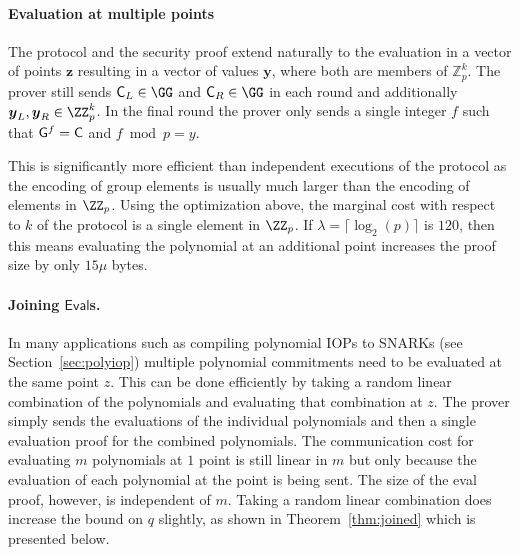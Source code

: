 
\paragraph{Evaluation at multiple points}
The protocol and the security proof extend naturally to the evaluation in a vector of points $\boldsymbol{z}$ resulting in a vector of values $\boldsymbol{y}$, where both are members of $\mathbb{Z}_p^k$. The prover still sends $\gr{C}_L\in \GG$ and $\gr{C}_R\in \GG$ in each round and additionally $\boldsymbol{y}_L,\boldsymbol{y}_R \in \ZZ^k_p$. In the final round the prover only sends a single integer $f$ such that $\gr{g}^{f}=\gr{C}$ and $f \bmod p=y$.

This is significantly more efficient than independent executions of the protocol as the encoding of group elements is usually much larger than the encoding of elements in $\ZZ_p$. Using the optimization above, the marginal cost with respect to $k$ of the protocol is a single element in $\ZZ_p$. If $\lambda=\lceil\log_2(p)\rceil$ is $120$, then this means evaluating the polynomial at an additional point increases the proof size by only $15\mu$ bytes.


\paragraph{Joining $\mathsf{Eval}$s.} 
In many applications such as compiling polynomial IOPs to SNARKs (see Section~\ref{sec:polyiop}) multiple polynomial commitments need to be evaluated at the same point $z$. 
This can be done efficiently by taking a random linear combination of the polynomials and evaluating that combination at $z$. The prover simply sends the evaluations of the individual polynomials and then a single evaluation proof for the combined polynomials. The communication cost for evaluating $m$ polynomials at $1$ point is still linear in $m$ but only because the evaluation of each polynomial at the point is being sent. The size of the eval proof, however, is independent of $m$. 
Taking a random linear combination does increase the bound on $q$ slightly, as shown in Theorem~\ref{thm:joined} which is presented below.

